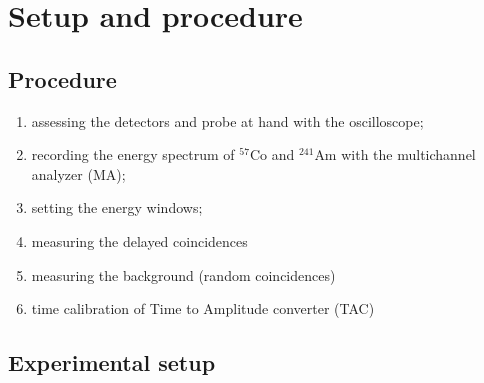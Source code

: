 \section{Setup and procedure}
\subsection{Procedure} 
\begin{enumerate}
    \item 
        assessing the detectors and probe at hand with the oscilloscope;
    \item 
        recording the energy spectrum of $^{57}$Co and $^{241}$Am with the multichannel analyzer (MA); 
    \item
        setting the energy windows;
    \item
        measuring the delayed coincidences 
    \item
        measuring the background (random coincidences)
    \item
        time calibration of Time to Amplitude converter (TAC)
\end{enumerate}




\subsection{Experimental setup}


